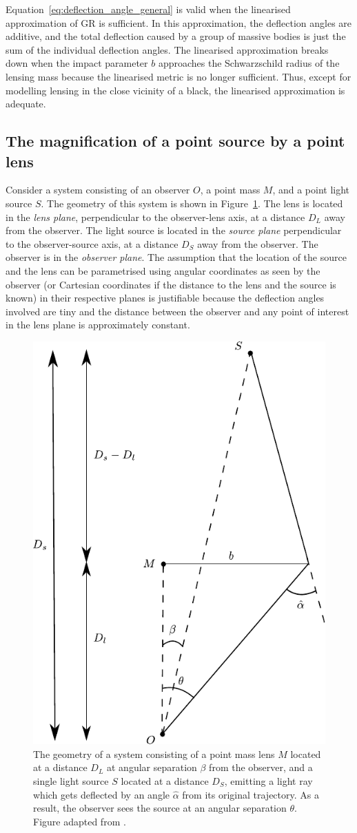 \documentclass[12pt,dvipsnames]{report}
\begin{document}
Equation~\ref{eq:deflection_angle_general} is valid when the linearised
approximation of GR is sufficient. In this approximation, the deflection angles
are additive, and the total deflection caused by a group of massive bodies is just
the sum of the individual deflection angles. The linearised approximation
breaks down when the impact parameter $b$ approaches the Schwarzschild radius
of the lensing mass because the linearised metric is no longer sufficient. Thus, 
except for modelling lensing in the close vicinity of a black, the linearised
approximation is adequate.

\subsection{The magnification of a point source by a point lens}
Consider a system consisting of an observer $O$, a point mass $M$, and a point
light source $S$. The geometry of this system is shown in
Figure~\ref{fig:lens_geometry}. The lens is located in the \emph{lens plane}, 
perpendicular to the observer-lens axis, at a distance $D_L$ away from
the observer. The light source is located in the \emph{source plane}
perpendicular to the observer-source axis, at a distance $D_S$ away from the
observer. The observer is in the \emph{observer plane}. The assumption that
the location of the source and the lens can be parametrised using
angular coordinates as seen by the observer (or Cartesian coordinates if the distance to the lens and
the source is known) in their respective planes is justifiable because the
deflection angles involved are tiny and the distance between the observer
and any point of interest in the lens plane is approximately constant.
\begin{figure}[!ht]
    \centering
    \includegraphics[width=0.4\linewidth]{../static/microlensing/lens_geometry.pdf}
    \caption{The geometry of a system consisting of a point mass lens $M$ located at a distance
        $D_L$ at angular separation $\beta$ from the observer, and a single light source $S$ 
        located at a distance $D_S$, emitting a light ray which gets
        deflected by an angle $\hat\alpha$ from its
        original trajectory. As a result, the observer sees the source at an angular separation
        $\theta$. Figure adapted from \citet{1992grle.book.....S}.}

    \label{fig:lens_geometry}
\end{figure}
\end{document}
